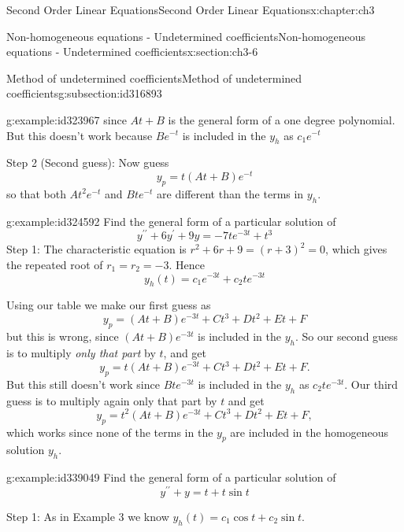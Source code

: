 \documentclass[oneside,10pt,]{book}
\numberwithin{equation}{section}
\numberwithin{equation}{section}
\begin{document}
\begin{chapterptx}{Second Order Linear Equations}{}{Second Order Linear Equations}{}{}{x:chapter:ch3}
\begin{sectionptx}{Non-homogeneous equations - Undetermined coefficients}{}{Non-homogeneous equations - Undetermined coefficients}{}{}{x:section:ch3-6}
\begin{subsectionptx}{Method of undetermined coefficients}{}{Method of undetermined coefficients}{}{}{g:subsection:id316893}
\begin{example}{}{g:example:id323967}
since \(At+B\) is the general form of a one degree polynomial. But this doesn't work because \(Be^{-t}\) is included in the \(y_{h}\) as \(c_{1}e^{-t}\)%
\par
Step 2 (Second guess): Now guess%
\begin{equation*}
y_{p}=t\left(At+B\right)e^{-t}
\end{equation*}
so that both \(At^{2}e^{-t}\) and \(Bte^{-t}\) are different than the terms in \(y_{h}\).%
\end{example}
\begin{example}{}{g:example:id324592}%
Find the general form of a particular solution of%
\begin{equation*}
y^{\prime\prime}+6y^{\prime}+9y=-7te^{-3t}+t^{3}
\end{equation*}
Step 1: The characteristic equation is \(r^{2}+6r+9=(r+3)^{2}=0\), which gives the repeated root of \(r_{1}=r_{2}=-3\). Hence%
\begin{equation*}
y_{h}(t)=c_{1}e^{-3t}+c_{2}te^{-3t}
\end{equation*}
%
\par
Using our table we make our first guess as%
\begin{equation*}
y_{p}=\left(At+B\right)e^{-3t}+Ct^{3}+Dt^{2}+Et+F
\end{equation*}
but this is wrong, since \(\left(At+B\right)e^{-3t}\) is included in the \(y_{h}\). So our second guess is to multiply \emph{only that part} by \(t\), and get%
\begin{equation*}
y_{p}=t\left(At+B\right)e^{-3t}+Ct^{3}+Dt^{2}+Et+F.
\end{equation*}
But this still doesn't work since \(Bte^{-3t}\) is included in the \(y_{h}\) as \(c_{2}te^{-3t}\). Our third guess is to multiply again only that part by \(t\) and get%
\begin{equation*}
y_{p}=t^{2}\left(At+B\right)e^{-3t}+Ct^{3}+Dt^{2}+Et+F,
\end{equation*}
which works since none of the terms in the \(y_{p}\) are included in the homogeneous solution \(y_{h}\).%
\end{example}
\begin{example}{}{g:example:id339049}%
Find the general form of a particular solution of%
\begin{equation*}
y^{\prime\prime}+y=t+t\sin t
\end{equation*}
%
\par
Step 1: As in Example 3 we know \(y_{h}(t)=c_{1}\cos t+c_{2}\sin t.\)%
\par

\end{example}
\end{subsectionptx}
\end{sectionptx}
\end{chapterptx}
\end{document}
